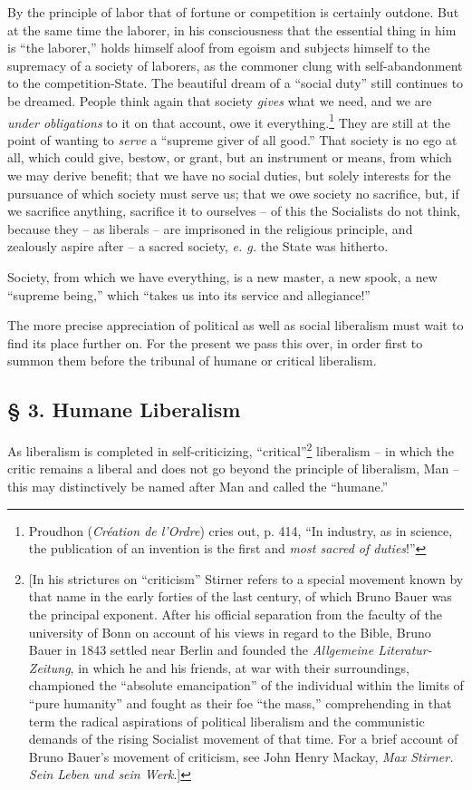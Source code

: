 \documentclass[12pt,a4paper]{book}
\begin{document}
By the principle of labor that of fortune or competition is certainly outdone. 
But at the same time the laborer, in his consciousness that the essential 
thing in him is ``the laborer,'' holds himself aloof from egoism and 
subjects himself to the supremacy of a society of laborers, as the commoner 
clung with self-abandonment to the competition-State. The beautiful dream of a 
``social duty'' still continues to be dreamed. People think again that 
society \textit{gives} what we need, and we are \textit{under obligations} to 
it on that account, owe it everything.\footnote{Proudhon (\textit{Cr\'eation 
de l'Ordre}) cries out, p. 414, ``In industry, as in science, the publication 
of an invention is the first and \textit{most sacred of duties}!''} They are 
still at the point of wanting to \textit{serve} a ``supreme giver of all 
good.'' That society is no ego at all, which could give, bestow, or grant, 
but an instrument or means, from which we may derive benefit; that we have no 
social duties, but solely interests for the pursuance of which society must 
serve us; that we owe society no sacrifice, but, if we sacrifice anything, 
sacrifice it to ourselves -- of this the Socialists do not think, because they 
-- as liberals -- are imprisoned in the religious principle, and zealously 
aspire after -- a sacred society, \textit{e. g.} the State was hitherto.

Society, from which we have everything, is a new master, a new spook, a new 
``supreme being,'' which ``takes us into its service and allegiance!''

The more precise appreciation of political as well as social liberalism must 
wait to find its place further on. For the present we pass this over, in order 
first to summon them before the tribunal of humane or critical liberalism.

\subsection[\S{} 3. Humane Liberalism]{\centering \S{} 3. Humane Liberalism}

As liberalism is completed in self-criticizing, ``critical''\footnote{[In 
his strictures on ``criticism'' Stirner refers to a special movement known 
by that name in the early forties of the last century, of which Bruno Bauer 
was the principal exponent. After his official separation from the faculty of 
the university of Bonn on account of his views in regard to the Bible, Bruno 
Bauer in 1843 settled near Berlin and founded the \textit{Allgemeine 
Literatur-Zeitung}, in which he and his friends, at war with their 
surroundings, championed the ``absolute emancipation'' of the individual 
within the limits of ``pure humanity'' and fought as their foe ``the 
mass,'' comprehending in that term the radical aspirations of political 
liberalism and the communistic demands of the rising Socialist movement of 
that time. For a brief account of Bruno Bauer's movement of criticism, see 
John Henry Mackay, \textit{Max Stirner. Sein Leben und sein Werk}.]} 
liberalism -- in which the critic remains a liberal and does not go beyond the 
principle of liberalism, Man -- this may distinctively be named after Man and 
called the ``humane.''
\end{document}

